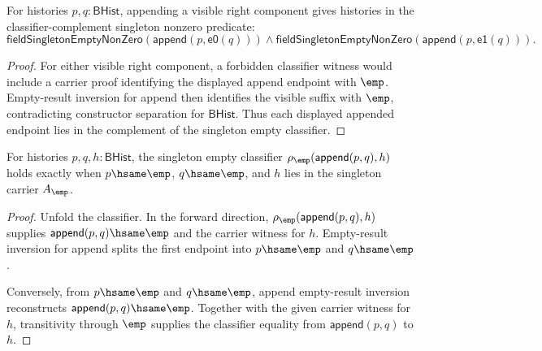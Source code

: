 \begin{theorem}
\label{thm:field-singleton-empty-nonzero-append-visible-right}
For histories $p,q:\mathsf{BHist}$, appending a visible right component gives
histories in the classifier-complement singleton nonzero predicate:
$$
\mathsf{fieldSingletonEmptyNonZero}(\mathsf{append}(p,\mathsf{e0}(q)))
\land
\mathsf{fieldSingletonEmptyNonZero}(\mathsf{append}(p,\mathsf{e1}(q))).
$$
\end{theorem}
\begin{proof}
For either visible right component, a forbidden classifier witness would
include a carrier proof identifying the displayed append endpoint with
$\emp$. Empty-result inversion for append then identifies the visible suffix
with $\emp$, contradicting constructor separation for $\mathsf{BHist}$. Thus
each displayed appended endpoint lies in the complement of the singleton empty
classifier.
\end{proof}

\begin{theorem}
\label{thm:field-singleton-empty-classifier-append-split-empty}
For histories $p,q,h:\mathsf{BHist}$, the singleton empty classifier
$\rho_{\emp}(\mathsf{append}(p,q),h)$ holds exactly when
$p\hsame\emp$, $q\hsame\emp$, and $h$ lies in the singleton carrier
$A_{\emp}$.
\end{theorem}
\begin{proof}
Unfold the classifier. In the forward direction,
$\rho_{\emp}(\mathsf{append}(p,q),h)$ supplies
$\mathsf{append}(p,q)\hsame\emp$ and the carrier witness for $h$.
Empty-result inversion for append splits the first endpoint into
$p\hsame\emp$ and $q\hsame\emp$.

Conversely, from $p\hsame\emp$ and $q\hsame\emp$, append empty-result
inversion reconstructs $\mathsf{append}(p,q)\hsame\emp$. Together with the
given carrier witness for $h$, transitivity through $\emp$ supplies the
classifier equality from $\mathsf{append}(p,q)$ to $h$.
\end{proof}

